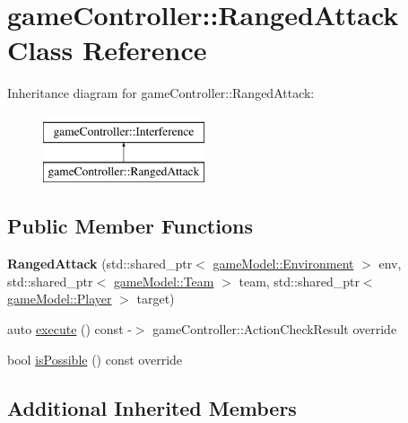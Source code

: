 \hypertarget{classgame_controller_1_1_ranged_attack}{\section{game\-Controller\-:\-:Ranged\-Attack Class Reference}
\label{classgame_controller_1_1_ranged_attack}
}
Inheritance diagram for game\-Controller\-:\-:Ranged\-Attack\-:\begin{figure}[H]
\begin{center}
\leavevmode
\includegraphics[height=2.000000cm]{classgame_controller_1_1_ranged_attack}
\end{center}
\end{figure}
\subsection*{Public Member Functions}
\begin{DoxyCompactItemize}
\item 
\hypertarget{classgame_controller_1_1_ranged_attack_a467d9e5a0c8e6c19b3f3214bc3781c19}{{\bfseries Ranged\-Attack} (std\-::shared\-\_\-ptr$<$ \hyperlink{classgame_model_1_1_environment}{game\-Model\-::\-Environment} $>$ env, std\-::shared\-\_\-ptr$<$ \hyperlink{classgame_model_1_1_team}{game\-Model\-::\-Team} $>$ team, std\-::shared\-\_\-ptr$<$ \hyperlink{classgame_model_1_1_player}{game\-Model\-::\-Player} $>$ target)}\label{classgame_controller_1_1_ranged_attack_a467d9e5a0c8e6c19b3f3214bc3781c19}

\item 
auto \hyperlink{classgame_controller_1_1_ranged_attack_a7c5cb7567f7f6bc8fb844837240d7c09}{execute} () const -\/$>$ game\-Controller\-::\-Action\-Check\-Result override
\item 
bool \hyperlink{classgame_controller_1_1_ranged_attack_a95776ac1efedefee37dd42acd5308e6b}{is\-Possible} () const override
\end{DoxyCompactItemize}
\subsection*{Additional Inherited Members}



